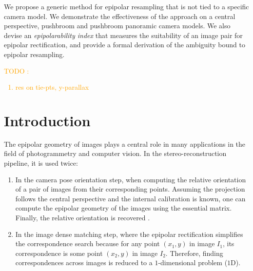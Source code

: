 \documentclass{ipol}
\newcommand{\er}[1]{\textcolor{orange}{#1}}
\begin{document}
\begin{ipolAbstract}
We propose a generic method for epipolar resampling that is not tied to a specific camera model. We demonstrate the effectiveness of the approach on a central perspective, pushbroom and pushbroom panoramic camera models. We also devise an \textit{epipolarability index} that measures the suitability of an image pair for epipolar rectification, and provide a formal derivation of the ambiguity bound to epipolar resampling. 
\end{ipolAbstract}


\er{
TODO :
\begin{enumerate}
\item res on tie-pts, y-parallax
\end{enumerate}}

\section{Introduction}
The epipolar geometry of images plays a central role in many applications in the field of photogrammetry and computer vision. In the stereo-reconstruction pipeline, it is used twice:

\begin{enumerate}
   \item In the camera pose orientation step, when computing the
      relative orientation of a pair of images from their corresponding points. Assuming 
      the projection follows the central perspective and the internal calibration is known,
      one can compute the epipolar geometry of the images using the essential matrix. Finally, the relative orientation is recovered \cite{fusiello2000epi}.   
     
   \item In the image dense matching step, where the epipolar rectification simplifies the 
       correspondence search because for any point $(x_1,y)$ in image $I_1$, its correspondence is some point $(x_2,y)$ in image $I_2$. Therefore, finding correspondences across images is reduced to 
        a $1$-dimensional problem ($1$D).
\end{enumerate}
\end{document}
